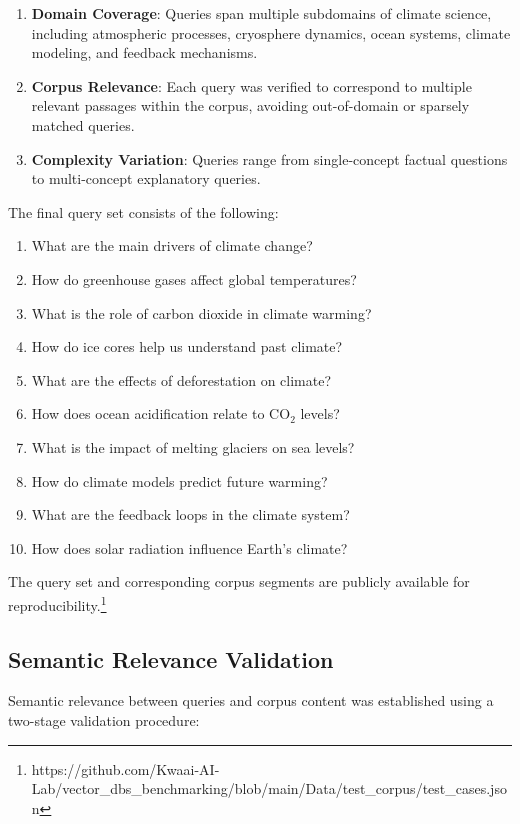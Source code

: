 \documentclass{article}
\begin{document}
\begin{enumerate}
\item \textbf{Domain Coverage}: Queries span multiple subdomains of climate science, including atmospheric processes, cryosphere dynamics, ocean systems, climate modeling, and feedback mechanisms.
\item \textbf{Corpus Relevance}: Each query was verified to correspond to multiple relevant passages within the corpus, avoiding out-of-domain or sparsely matched queries.
\item \textbf{Complexity Variation}: Queries range from single-concept factual questions to multi-concept explanatory queries.
\end{enumerate}

The final query set consists of the following:

\begin{enumerate}
\item What are the main drivers of climate change?
\item How do greenhouse gases affect global temperatures?
\item What is the role of carbon dioxide in climate warming?
\item How do ice cores help us understand past climate?
\item What are the effects of deforestation on climate?
\item How does ocean acidification relate to CO$_2$ levels?
\item What is the impact of melting glaciers on sea levels?
\item How do climate models predict future warming?
\item What are the feedback loops in the climate system?
\item How does solar radiation influence Earth's climate?
\end{enumerate}

The query set and corresponding corpus segments are publicly available for reproducibility.\footnote{https://github.com/Kwaai-AI-Lab/vector\_dbs\_benchmarking/blob/main/Data/test\_corpus/test\_cases.json}

\subsection{Semantic Relevance Validation}

Semantic relevance between queries and corpus content was established using a two-stage validation procedure:
\end{document}
